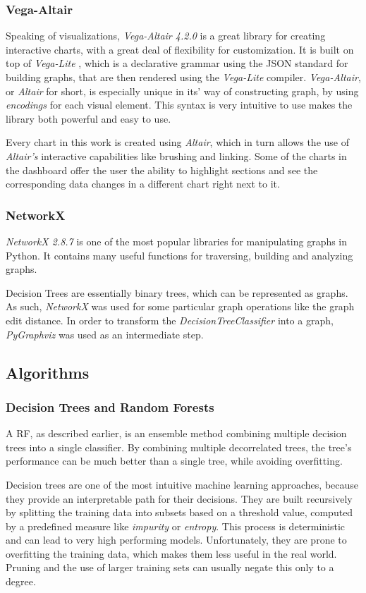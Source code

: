 \documentclass[a4paper, 12pt]{article}
\begin{document}
\subsubsection{Vega-Altair}
Speaking of visualizations, \textit{Vega-Altair 4.2.0} \cite{VanderPlas2018} is a great library for
creating interactive charts, with a great deal of flexibility for customization. It is built
on top of \textit{Vega-Lite} \cite{Satyanarayan2017}, which is a declarative grammar using
the JSON standard for building graphs, that are then rendered using the \textit{Vega-Lite}
compiler. \textit{Vega-Altair}, or \textit{Altair} for short, is especially unique in its'
way of constructing graph, by using \textit{encodings} for each visual element. This syntax
is very intuitive to use makes the library both powerful and easy to use. \par
Every chart in this work is created using \textit{Altair}, which in turn allows the use of
\textit{Altair's} interactive capabilities like brushing and linking. Some of the charts in the
dashboard offer the user the ability to highlight sections and see the corresponding data changes
in a different chart right next to it.

\subsubsection{NetworkX}
\textit{NetworkX 2.8.7} \cite{SciPyProceedings_11} is one of the most popular libraries for
manipulating graphs in Python. It contains many useful functions for traversing, building
and analyzing graphs. \par
Decision Trees are essentially binary trees, which can be represented as graphs. As such,
\textit{NetworkX} was used for some particular graph operations like the graph edit distance.
In order to transform the \textit{DecisionTreeClassifier} into a graph, \textit{PyGraphviz}
was used as an intermediate step.

\subsection{Algorithms}
\subsubsection{Decision Trees and Random Forests}
A RF, as described earlier, is an ensemble method combining multiple decision trees into a
single classifier. By combining multiple decorrelated trees, the tree's performance can be
much better than a single tree, while avoiding overfitting.
\par
Decision trees are one of the most intuitive machine learning approaches, because they
provide an interpretable path for their decisions. They are built recursively by splitting
the training data into subsets based on a threshold value, computed by a predefined measure
like \textit{impurity} or \textit{entropy}. This process is deterministic and can lead to
very high performing models. Unfortunately, they are prone to overfitting the training data,
which makes them less useful in the real world. Pruning and the use of larger training
sets can usually negate this only to a degree. \par
\end{document}
